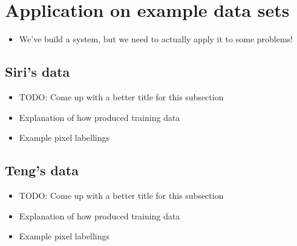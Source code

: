 \documentclass[12pt,twoside,notitlepage]{report}
\begin{document}



    \section{Application on example data sets}
        \begin{itemize}
            \item We've build a system, but we need to actually apply it to some problems!
        \end{itemize} 

        \subsection{Siri's data}
            \begin{itemize}
                \item TODO: Come up with a better title for this subsection
                \item Explanation of how produced training data
                \item Example pixel labellings
            \end{itemize}

        \subsection{Teng's data}
            \begin{itemize}
                \item TODO: Come up with a better title for this subsection
                \item Explanation of how produced training data
                \item Example pixel labellings
            \end{itemize}
\end{document}
